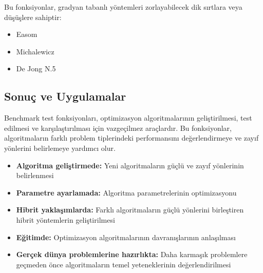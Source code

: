 Bu fonksiyonlar, gradyan tabanlı yöntemleri zorlayabilecek dik sırtlara veya düşüşlere sahiptir:

\begin{itemize}
    \item Easom
    \item Michalewicz
    \item De Jong N.5
\end{itemize}

\subsection{Sonuç ve Uygulamalar}

Benchmark test fonksiyonları, optimizasyon algoritmalarının geliştirilmesi, test edilmesi ve karşılaştırılması için vazgeçilmez araçlardır. Bu fonksiyonlar, algoritmaların farklı problem tiplerindeki performansını değerlendirmeye ve zayıf yönlerini belirlemeye yardımcı olur.

\begin{itemize}
    \item \textbf{Algoritma geliştirmede:} Yeni algoritmaların güçlü ve zayıf yönlerinin belirlenmesi
    \item \textbf{Parametre ayarlamada:} Algoritma parametrelerinin optimizasyonu
    \item \textbf{Hibrit yaklaşımlarda:} Farklı algoritmaların güçlü yönlerini birleştiren hibrit yöntemlerin geliştirilmesi
    \item \textbf{Eğitimde:} Optimizasyon algoritmalarının davranışlarının anlaşılması
    \item \textbf{Gerçek dünya problemlerine hazırlıkta:} Daha karmaşık problemlere geçmeden önce algoritmaların temel yeteneklerinin değerlendirilmesi
\end{itemize}

